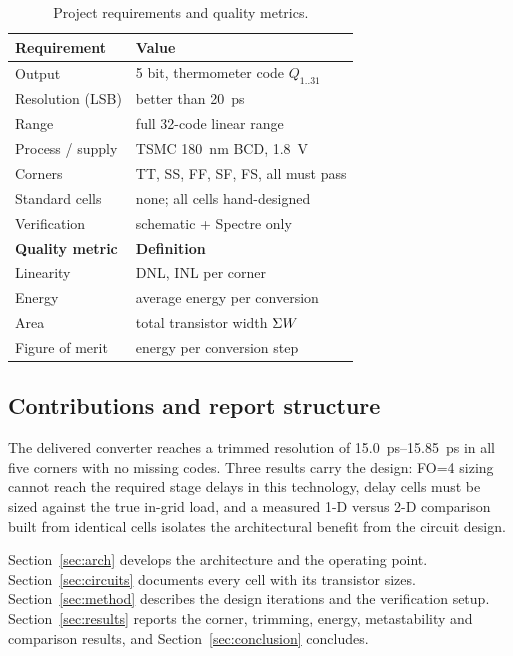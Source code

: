 \begin{table}[H]
\centering
\small
\caption{Project requirements and quality metrics.}
\label{tab:spec}
\begin{tabular}{l l}
\toprule
\textbf{Requirement} & \textbf{Value} \\
\midrule
Output & 5 bit, thermometer code $Q_{1..31}$ \\
Resolution (LSB) & better than \SI{20}{\pico\second} \\
Range & full 32-code linear range \\
Process / supply & TSMC \SI{180}{\nano\meter} BCD, \SI{1.8}{\volt} \\
Corners & TT, SS, FF, SF, FS, all must pass \\
Standard cells & none; all cells hand-designed \\
Verification & schematic + Spectre only \\
\midrule
\textbf{Quality metric} & \textbf{Definition} \\
\midrule
Linearity & DNL, INL per corner \\
Energy & average energy per conversion \\
Area & total transistor width $\Sigma W$ \\
Figure of merit & energy per conversion step \\
\bottomrule
\end{tabular}
\end{table}

\subsection{Contributions and report structure}

The delivered converter reaches a trimmed resolution of
\SIrange{15.0}{15.85}{\pico\second} in all five corners with no missing codes.
Three results carry the design: FO=4 sizing cannot reach the required stage
delays in this technology, delay cells must be sized against the true in-grid
load, and a measured 1-D versus 2-D comparison built from identical cells
isolates the architectural benefit from the circuit design.

Section~\ref{sec:arch} develops the architecture and the operating point.
Section~\ref{sec:circuits} documents every cell with its transistor sizes.
Section~\ref{sec:method} describes the design iterations and the verification
setup. Section~\ref{sec:results} reports the corner, trimming, energy,
metastability and comparison results, and Section~\ref{sec:conclusion}
concludes.
